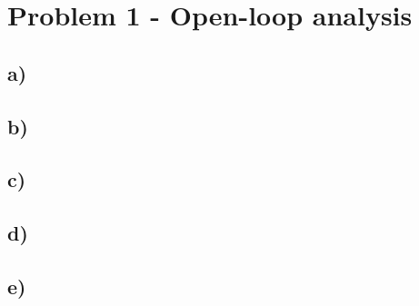 \section*{Problem 1 - Open-loop analysis}

\subsection*{a)}


\subsection*{b)}



\subsection*{c)}



\subsection*{d)}




\subsection*{e)}